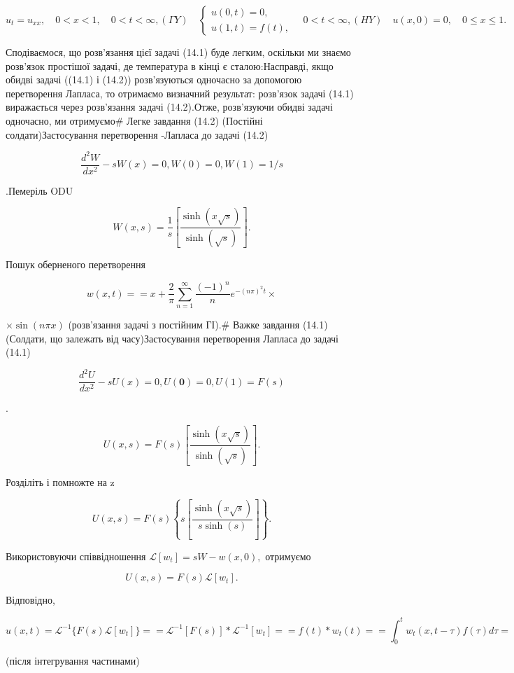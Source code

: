 \documentclass[
  ukrainian,
]{article}
\begin{document}
\[
u_{t} = u_{xx}, \quad 0 < x < 1, \quad 0 < t < \infty,
(\Gamma Y) \quad \begin{cases} u(0, t) = 0, \\ u(1, t) = f(t), \end{cases} \quad 0 < t < \infty,
(HY) \quad u(x, 0) = 0, \quad 0 \le x \le 1.
\]

Сподіваємося, що розв'язання цієї задачі (14.1) буде легким, оскільки ми
знаємо розв'язок простішої задачі, де температура в кінці є
сталою:Насправді, якщо обидві задачі ((14.1) і (14.2)) розв'язуються
одночасно за допомогою перетворення Лапласа, то отримаємо визначний
результат: розв'язок задачі (14.1) виражається через розв'язання задачі
(14.2).Отже, розв'язуючи обидві задачі одночасно, ми отримуємо\# Легке
завдання (14.2) (Постійні солдати)Застосування перетворення -Лапласа до
задачі (14.2)

\[
\frac{d^2W}{dx^2} - sW(x) = 0,
W(0) = 0,
W(1) = 1/s
\]

.Пемеріль ODU

\[
W(x, s) = \frac{1}{s} \left[ \frac{\sinh(x \sqrt{s})}{\sinh(\sqrt{s})} \right].
\]

Пошук оберненого перетворення

\[
w(x, t) =
= x + \frac{2}{\pi} \sum_{n=1}^{\infty} \frac{(-1)^n}{n} e^{-(n\pi)^2 t} \times
\]

\(\times \sin(n\pi x)\) (розв'язання задачі з постійним ГІ).\# Важке
завдання (14.1) (Солдати, що залежать від часу)Застосування перетворення
Лапласа до задачі (14.1)

\[
\frac{d^2U}{dx^2} - sU(x) = 0,
U\left( \mathbf{0}\right) =0,
U(1) = F(s)
\]

.

\[
U(x, s) = F(s) \left[ \frac{\sinh(x \sqrt{s})}{\sinh(\sqrt{s})} \right].
\]

Розділіть і помножте на z

\[
U(x, s) = F(s) \left\{ s \left[ \frac{\sinh(x \sqrt{s})}{s \sinh(s)} \right] \right\}.
\]

Використовуючи співвідношення \(\mathscr{L}[w_t] = sW - w(x, 0),\)
отримуємо

\[
U(x, s) = F(s) \mathcal{L}[w_t].
\]

Відповідно,

\[
u(x, t) = \mathcal{L}^{-1} \{ F(s) \mathcal{L}[w_t] \} =
= \mathcal{L}^{-1} [ F(s) ] * \mathcal{L}^{-1}[w_t] =
= f(t) * w_t(t) =
= \int_0^t w_t(x, t-\tau) f(\tau) d\tau =
\]

(після інтегрування частинами)
\end{document}
